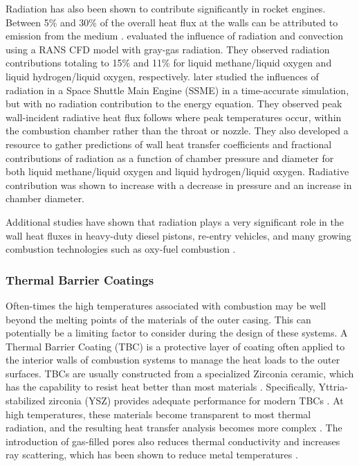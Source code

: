 Radiation has also been shown to contribute significantly in rocket engines. Between 5\% and 30\% of the overall heat flux at the walls can be attributed to emission from the medium \cite{Johnson2021AnalysisMethod,Sutton2001RocketElements,Naraghi2005ModelingEngines,Pizzarelli2021OverviewChambers}. \citet{Leccese2018ConvectiveChambers} evaluated the influence of radiation and convection using a RANS CFD model with gray-gas radiation. 
They observed radiation contributions totaling to 15\% and 11\% for liquid methane/liquid oxygen and liquid hydrogen/liquid oxygen, respectively.
\citet{Leccese2019NumericalChambers} later studied the influences of radiation in a Space Shuttle Main Engine (SSME) in a time-accurate simulation, but with no radiation contribution to the energy equation.
They observed peak wall-incident radiative heat flux follows where peak temperatures occur, within the combustion chamber rather than the throat or nozzle. They also developed a resource to gather predictions of wall heat transfer coefficients and fractional contributions of radiation as a function of chamber pressure and diameter for both liquid methane/liquid oxygen and liquid hydrogen/liquid oxygen.
Radiative contribution was shown to increase with a decrease in pressure and an increase in chamber diameter.

Additional studies have shown that radiation plays a very significant role in the wall heat fluxes in heavy-duty diesel pistons, re-entry vehicles, and many growing combustion technologies such as oxy-fuel combustion \cite{Modest2016RadiativeSystems}.


\subsubsection{Thermal Barrier Coatings}
Often-times the high temperatures associated with combustion may be well beyond the melting points of the materials of the outer casing. This can potentially be a limiting factor to consider during the design of these systems.
A Thermal Barrier Coating (TBC) is a protective layer of coating often applied to the interior walls of combustion systems to manage the heat loads to the outer surfaces. 
TBCs are usually constructed from a specialized Zirconia ceramic, which has the capability to resist heat
better than most materials \cite{Miller1997ThermalDirections}. Specifically, Yttria-stabilized zirconia (YSZ) provides adequate performance for modern TBCs \cite{Padture2002ThermalApplications}. At high temperatures, these materials become transparent to most thermal radiation, and the resulting heat transfer analysis becomes more complex \cite{Howell2010ThermalTransfer, Siegel1998AnalysisCoatings}. The
introduction of gas-filled pores also reduces thermal conductivity and increases ray scattering, which has been shown to reduce metal temperatures \cite{Boissonnet2019EvolutionTemperature,Spuckler1996Two-FluxLayers}.

